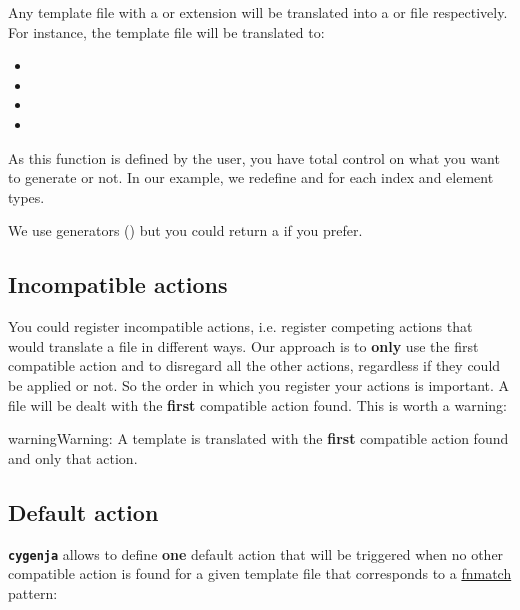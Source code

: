 \documentclass[letterpaper,10pt,english]{sphinxmanual}
\begin{document}
Any template file with a  or  extension will be translated into a  or  file respectively. For instance, the template file  will be translated to:
\begin{itemize}
\item {} 

\item {} 

\item {} 

\item {} 

\end{itemize}

As this function is defined by the user, you have total control on what you want to generate or not. In our example, we redefine  and  for each index and element types.

We use generators () but you could return a  if you prefer.


\subsection{Incompatible actions}
\label{usage:incompatible-actions}
You could register incompatible actions, i.e. register competing actions that would translate a file in different ways. Our approach is to \textbf{only} use the first compatible action and to disregard all the other actions, regardless
if they could be applied or not. So the order in which you register your actions is important. A file will be dealt with the \textbf{first} compatible action found. This is worth a warning:

\begin{notice}{warning}{Warning:}
A template is translated with the \textbf{first} compatible action found and only that action.
\end{notice}


\subsection{Default action}
\label{usage:default-action}
\textbf{\texttt{cygenja}} allows to define \textbf{one} default action that will be triggered when no other compatible action is found for a given
template file that corresponds to a \href{https://docs.python.org/2/library/fnmatch.html}{fnmatch} pattern:
\end{document}

